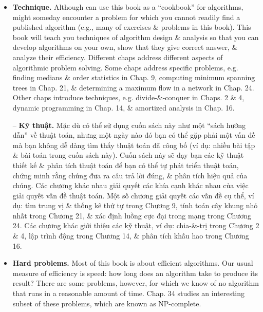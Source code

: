 \documentclass{article}
\begin{document}
\begin{itemize}
\begin{itemize}
\begin{itemize}
            {\bf Data structures.} This book also presents several data structures. A {\it data structure} is a way to store \& organize data in order to facilitate access \& modifications. Using appropriate data structure or structures is an important part of algorithm design. No single data structure works well for all purposes, \& so you should know strengths \& limitations of serval of them.
            
            -- {\bf Cấu trúc dữ liệu.} Cuốn sách này cũng trình bày một số cấu trúc dữ liệu. {\it cấu trúc dữ liệu} là một cách để lưu trữ \& tổ chức dữ liệu nhằm tạo điều kiện truy cập \& sửa đổi. Sử dụng cấu trúc dữ liệu hoặc các cấu trúc phù hợp là một phần quan trọng của thiết kế thuật toán. Không có cấu trúc dữ liệu đơn lẻ nào hoạt động tốt cho mọi mục đích, \& vì vậy bạn nên biết điểm mạnh \& hạn chế của một số cấu trúc.
            \item {\bf Technique.} Although can use this book as a ``cookbook'' for algorithms, might someday encounter a problem for which you cannot readily find a published algorithm (e.g., many of exercises \& problems in this book). This book will teach you techniques of algorithm design \& analysis so that you can develop algorithms on your own, show that they give correct answer, \& analyze their efficiency. Different chaps address different aspects of algorithmic problem solving. Some chaps address specific problems, e.g. finding medians \& order statistics in Chap. 9, computing minimum spanning trees in Chap. 21, \& determining a maximum flow in a network in Chap. 24. Other chaps introduce techniques, e.g. divide-\&-conquer in Chaps. 2 \& 4, dynamic programming in Chap. 14, \& amortized analysis in Chap. 16.
            
            -- {\bf Kỹ thuật.} Mặc dù có thể sử dụng cuốn sách này như một ``sách hướng dẫn'' về thuật toán, nhưng một ngày nào đó bạn có thể gặp phải một vấn đề mà bạn không dễ dàng tìm thấy thuật toán đã công bố (ví dụ: nhiều bài tập \& bài toán trong cuốn sách này). Cuốn sách này sẽ dạy bạn các kỹ thuật thiết kế \& phân tích thuật toán để bạn có thể tự phát triển thuật toán, chứng minh rằng chúng đưa ra câu trả lời đúng, \& phân tích hiệu quả của chúng. Các chương khác nhau giải quyết các khía cạnh khác nhau của việc giải quyết vấn đề thuật toán. Một số chương giải quyết các vấn đề cụ thể, ví dụ: tìm trung vị \& thống kê thứ tự trong Chương 9, tính toán cây khung nhỏ nhất trong Chương 21, \& xác định luồng cực đại trong mạng trong Chương 24. Các chương khác giới thiệu các kỹ thuật, ví dụ: chia-\&-trị trong Chương 2 \& 4, lập trình động trong Chương 14, \& phân tích khấu hao trong Chương 16.
            \item {\bf Hard problems.} Most of this book is about efficient algorithms. Our usual measure of efficiency is speed: how long does an algorithm take to produce its result? There are some problems, however, for which we know of no algorithm that runs in a reasonable amount of time. Chap. 34 studies an interesting subset of these problems, which are known as NP-complete.
            

\end{itemize}
\end{itemize}
\end{itemize}
\end{document}
